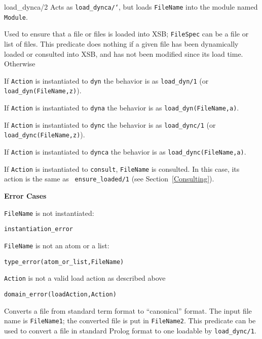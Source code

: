 \begin{description}
             {load\_dynca/2}\label{load_dynca/2}
%
Acts as {\tt load\_dynca/`}, but loads {\tt FileName} into the module
named {\tt Module}.

%
Used to ensure that a file or files is loaded into XSB; {\tt FileSpec}
can be a file or list of files.  This predicate does nothing if a
given file has been dynamically loaded or consulted into XSB, and has
not been modified since its load time.  Otherwise
%
\bi
\item If {\tt Action} is instantiated to {\tt dyn} the behavior is as
{\tt load\_dyn/1} (or {\tt load\_dyn(FileName,z)}).

\item If {\tt Action} is instantiated to {\tt dyna} the behavior is as
{\tt load\_dyn(FileName,a)}.

\item If {\tt Action} is instantiated to {\tt dync} the behavior is as
{\tt load\_dync/1} (or {\tt load\_dync(FileName,z)}).

\item If {\tt Action} is instantiated to {\tt dynca} the behavior is as
{\tt load\_dync(FileName,a)}.

\item If {\tt Action} is instantiated to {\tt consult}, {\tt FileName}
  is consulted.  In this case, its action is the same as {\tt
    ensure\_loaded/1} (see Section~\ref{Consulting}).

\ei

{\bf Error Cases}
\bi
\item 	{\tt FileName} is not instantiated:
\bi
\item 	{\tt instantiation\_error}
\ei
\item 	{\tt FileName} is not an atom or a list:
\bi
\item 	{\tt type\_error(atom\_or\_list,FileName)}
\ei
%
\item 	{\tt Action} is not a valid load action as described above
\bi
\item 	{\tt domain\_error(loadAction,Action)}
\ei
%
\ei

%
    Converts a file from standard term format to ``canonical'' format.
    The input file name is {\tt FileName1}; the converted file is put in
    {\tt FileName2}.  This predicate can be used to convert a file in
    standard Prolog format to one loadable by {\tt load\_dync/1}. 
\end{description} 

